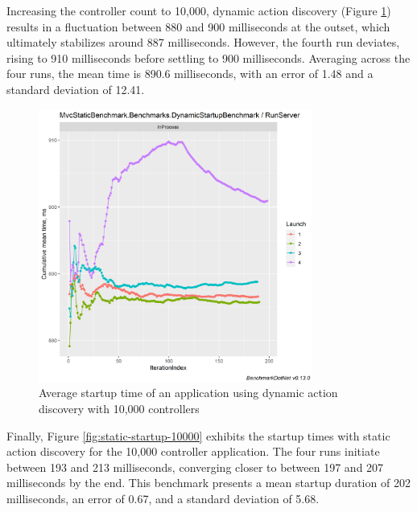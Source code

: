 Increasing the controller count to 10,000, dynamic action discovery (Figure \ref{fig:dynamic-startup-10000}) results in a fluctuation between 880 and 900 milliseconds at the outset, which ultimately stabilizes around 887 milliseconds. However, the fourth run deviates, rising to 910 milliseconds before settling to 900 milliseconds. Averaging across the four runs, the mean time is 890.6 milliseconds, with an error of 1.48 and a standard deviation of 12.41.

\begin{figure}[H]
\centering
\includegraphics[width=0.8\textwidth]{graphics/MvcStaticBenchmark.Benchmarks.DynamicStartupBenchmark-RunServer-cummean 10 000.png}
\caption{Average startup time of an application using dynamic action discovery with 10,000 controllers}
\label{fig:dynamic-startup-10000}
\end{figure}

Finally, Figure \ref{fig:static-startup-10000} exhibits the startup times with static action discovery for the 10,000 controller application. The four runs initiate between 193 and 213 milliseconds, converging closer to between 197 and 207 milliseconds by the end. This benchmark presents a mean startup duration of 202 milliseconds, an error of 0.67, and a standard deviation of 5.68.

